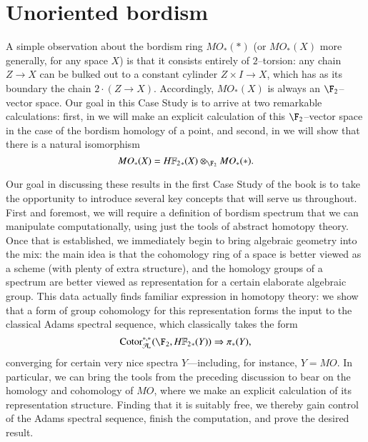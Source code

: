 
\chapter{Unoriented bordism}\label{UnorientedBordismChapter}




A simple observation about the bordism ring $MO_*(*)$ (or $MO_*(X)$ more generally, for any space $X$) is that it consists entirely of $2$--torsion: any chain $Z \to X$ can be bulked out to a constant cylinder $Z \times I \to X$, which has as its boundary the chain $2 \cdot (Z \to X)$.  Accordingly, $MO_*(X)$ is always an $\F_2$--vector space.  Our goal in this Case Study is to arrive at two remarkable calculations: first, in  we will make an explicit calculation of this $\F_2$--vector space in the case of the bordism homology of a point, and second, in  we will show that there is a natural isomorphism \[MO_*(X) = \HFtwo_*(X) \otimes_{\F_2} MO_*(*).\]

Our goal in discussing these results in the first Case Study of the book is to take the opportunity to introduce several key concepts that will serve us throughout.  First and foremost, we will require a definition of bordism spectrum that we can manipulate computationally, using just the tools of abstract homotopy theory.  Once that is established, we immediately begin to bring algebraic geometry into the mix: the main idea is that the cohomology ring of a space is better viewed as a scheme (with plenty of extra structure), and the homology groups of a spectrum are better viewed as representation for a certain elaborate algebraic group.  This data actually finds familiar expression in homotopy theory: we show that a form of group cohomology for this representation forms the input to the classical Adams spectral sequence, which classically takes the form \[\Cotor_{\mathcal A_*}^{*, *}(\F_2, \HFtwo_*(Y)) \Rightarrow \pi_*(Y),\] converging for certain very nice spectra $Y$---including, for instance, $Y = MO$.  In particular, we can bring the tools from the preceding discussion to bear on the homology and cohomology of $MO$, where we make an explicit calculation of its representation structure.  Finding that it is suitably free, we thereby gain control of the Adams spectral sequence, finish the computation, and prove the desired result.

